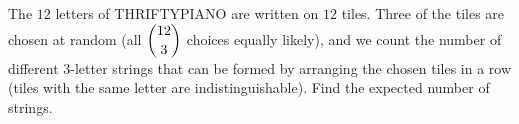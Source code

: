 The $12$ letters of THRIFTYPIANO are written on $12$ tiles. Three of the tiles are chosen at random (all $\dbinom{12}{3}$ choices equally likely), and we count the number of different $3$-letter strings that can be formed by arranging the chosen tiles in a row (tiles with the same letter are indistinguishable). Find the expected number of strings.
